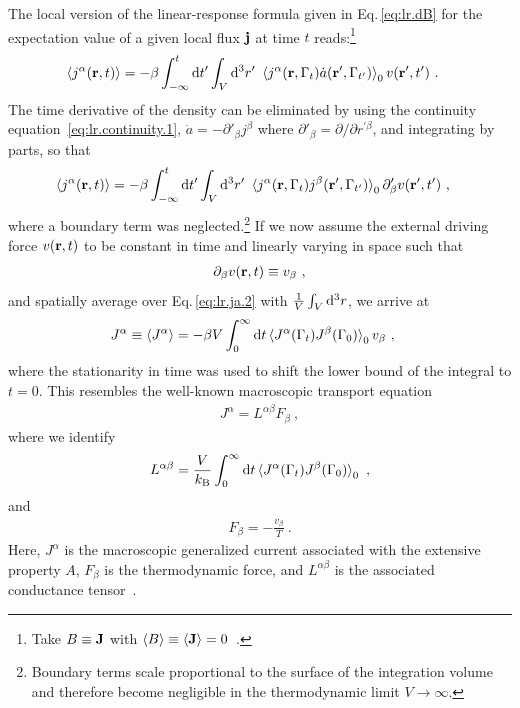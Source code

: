 The local version of the linear-response formula given in Eq.\,\eqref{eq:lr.dB} for the expectation value of a given local flux $\bf j$ at time $t$ reads:\footnote{Take \mbox{$B \equiv {\bf J}$} with $\braket{B} \equiv \braket{{\bf J}} = 0$~.}
\begin{align}
\braket{j^\alpha (\b r, t)}
	&= - \beta \int_{-\infty}^{t} \d t' \int_V \d^3 r' ~ \braket{
			j^\alpha (\b r, \Gamma_t) \dot{a} (\b r', \Gamma_{t'})
		}_0 v (\b r', t')~.
	\label{eq:lr.ja.1}
\end{align}
The time derivative of the density can be eliminated by using the continuity equation~\eqref{eq:lr.continuity.1}, $\dot a = - \partial'_\beta j^\beta$ where $\partial'_\beta = \partial/\partial r^{\prime \beta}$, and integrating by parts, so that
\begin{align}
\braket{j^\alpha (\b r , t) }
&= - \beta \int_{-\infty}^{t} \d t' \int_V \d^3 r' ~ \braket{
	j^\alpha (\b r, \Gamma_t) j^\beta (\b r', \Gamma_{t'})
}_0 \partial'_\beta v (\b r', t')~,
\label{eq:lr.ja.2}
\end{align}
where a boundary term was neglected.\footnote{Boundary terms scale proportional to the surface of the integration volume and therefore become negligible in the thermodynamic limit $V \to \infty$.}
If we now assume the external driving force $v ({\bf r}, t)$ to be constant in time and linearly varying in space such that
\begin{align}
	\partial_\beta v (\b r, t) \equiv v_\beta~,
	\label{eq:lr.force}
\end{align}
and spatially average over Eq.\,\eqref{eq:lr.ja.2} with $\frac{1}{V} \int_V {\rm d}^3 r$, we arrive at 
\begin{align}
	J^\alpha 
	\equiv \braket{J^\alpha}
		&= -\beta V \int_{0}^{\infty} 
		\d t
		\braket{
		J^\alpha (\Gamma_t) J^\beta (\Gamma_{0})
	}_0 
	v_\beta~,
	\label{eq:lr.J}
\end{align}
where the stationarity in time was used to shift the lower bound of the integral to $t=0$.
This resembles the well-known macroscopic transport equation
\begin{align}
	J^\alpha =  L^{\alpha \beta} F_\beta~,
		\label{eq:lr.LF}
\end{align}
where we identify
\begin{align}
	L^{\alpha \beta}
		= \frac{V}{k_{\rm B}} \int_{0}^{\infty} 
		\d t \braket{J^\alpha (\Gamma_t) J^\beta (\Gamma_{0})}_0 ~,
	\label{eq:lr.L}
\end{align}
and
\begin{align}
	F_\beta
		= - \frac{v_\beta}{T}~.
	\label{eq:lr.F}
\end{align}
Here, $J^\alpha$ is the macroscopic generalized current associated with the extensive property $A$, $F_\beta$ is the thermodynamic force, and $L^{\alpha \beta}$ is the associated conductance tensor~\cite{Onsager1931a,Baroni2020a}.


